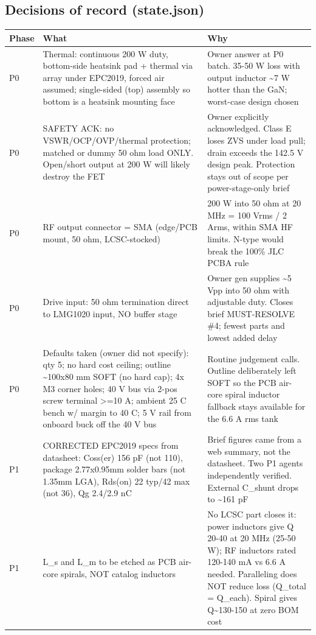 \documentclass[11pt,a4paper]{article}
\begin{document}
\subsection*{Decisions of record (state.json)}
{\small
\begin{longtable}{lp{5.2cm}p{7.2cm}}
\toprule
\textbf{Phase} & \textbf{What} & \textbf{Why} \\
\midrule
\endhead
P0 & Thermal: continuous 200 W duty, bottom-side heatsink pad + thermal via array under EPC2019, forced air assumed; single-sided (top) assembly so bottom is a heatsink mounting face & Owner answer at P0 batch. 35-50 W loss with output inductor \textasciitilde{}7 W hotter than the GaN; worst-case design chosen \\
P0 & SAFETY ACK: no VSWR/OCP/OVP/thermal protection; matched or dummy 50 ohm load ONLY. Open/short output at 200 W will likely destroy the FET & Owner explicitly acknowledged. Class E loses ZVS under load pull; drain exceeds the 142.5 V design peak. Protection stays out of scope per power-stage-only brief \\
P0 & RF output connector = SMA (edge/PCB mount, 50 ohm, LCSC-stocked) & 200 W into 50 ohm at 20 MHz = 100 Vrms / 2 Arms, within SMA HF limits. N-type would break the 100\% JLC PCBA rule \\
P0 & Drive input: 50 ohm termination direct to LMG1020 input, NO buffer stage & Owner gen supplies \textasciitilde{}5 Vpp into 50 ohm with adjustable duty. Closes brief MUST-RESOLVE \#4; fewest parts and lowest added delay \\
P0 & Defaults taken (owner did not specify): qty 5; no hard cost ceiling; outline \textasciitilde{}100x80 mm SOFT (no hard cap); 4x M3 corner holes; 40 V bus via 2-pos screw terminal \textgreater{}=10 A; ambient 25 C bench w/ margin to 40 C; 5 V rail from onboard buck off the 40 V bus & Routine judgement calls. Outline deliberately left SOFT so the PCB air-core spiral inductor fallback stays available for the 6.6 A rms tank \\
P1 & CORRECTED EPC2019 specs from datasheet: Coss(er) 156 pF (not 110), package 2.77x0.95mm solder bars (not 1.35mm LGA), Rds(on) 22 typ/42 max (not 36), Qg 2.4/2.9 nC & Brief figures came from a web summary, not the datasheet. Two P1 agents independently verified. External C\_shunt drops to \textasciitilde{}161 pF \\
P1 & L\_s and L\_m to be etched as PCB air-core spirals, NOT catalog inductors & No LCSC part closes it: power inductors give Q 20-40 at 20 MHz (25-50 W); RF inductors rated 120-140 mA vs 6.6 A needed. Paralleling does NOT reduce loss (Q\_total = Q\_each). Spiral gives Q\textasciitilde{}130-150 at zero BOM cost \\

\end{longtable}}
\end{document}
